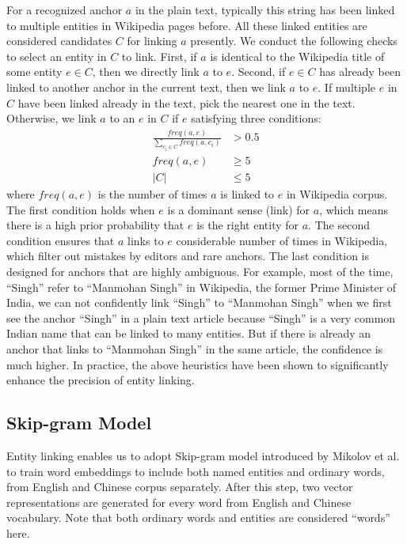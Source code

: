 For a recognized anchor $a$ in the plain text,
typically this string has been linked to multiple
entities in Wikipedia pages before. All these linked entities are considered
candidates $C$ for linking $a$ presently.
We conduct the following checks to select an entity in $C$ to link.
First, if $a$ is identical to the Wikipedia title of some entity
$e \in C$, then we directly link $a$ to $e$.
Second, if $e \in C$ has already been linked to another anchor in
the current text, then we link $a$ to $e$. If multiple $e$ in $C$ have been
linked already in the text, pick the nearest one in the text.
Otherwise, we link $a$ to an $e$ in $C$ if $e$ satisfying
three conditions:
\begin{align}
\frac{freq(a, e)}{\sum_{c_i \in C}freq(a, c_i)} &> 0.5\\
freq(a, e) &\geq 5\\
|C| &\leq 5
\end{align}
where $freq(a, e)$ is the number of times $a$ is linked to $e$ in
Wikipedia corpus. The first condition holds
when $e$ is a dominant sense (link) for $a$,
which means there is a high prior probability that $e$ is the right
entity for $a$. The second condition
ensures that $a$ links to $e$ considerable number of times in Wikipedia,
which filter out mistakes by editors and rare anchors.
The last condition is designed for anchors that are highly ambiguous.
For example, most of the time, ``Singh'' refer to ``Manmohan Singh'' in
Wikipedia, the former Prime Minister of India, we can not
confidently link ``Singh'' to ``Manmohan Singh'' when we first see
the anchor ``Singh'' in a plain text article because ``Singh'' is
a very common Indian name that can be linked to many entities.
But if there is already an anchor that links to
``Manmohan Singh'' in the same article,
the confidence is much higher. In practice, the above heuristics
have been shown to significantly enhance the precision of entity linking.

\subsection{Skip-gram Model}
\label{sec:skip}

Entity linking enables us to adopt
 Skip-gram model introduced by Mikolov
et al.~
to train word embeddings to include both named entities and ordinary words,
 from English and Chinese corpus separately.
After this step, two vector representations are generated
for every word from English and Chinese vocabulary.
Note that both ordinary words and entities are considered ``words''
here.

